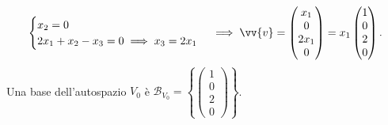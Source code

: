 \begin{dimostrazione}
\begin{enumerate}
\begin{equation}
\begin{cases}
            x_2 = 0 \\
            2x_1 + x_2 - x_3 = 0 \implies x_3 = 2x_1
        \end{cases}
        \implies \vv{v} = \begin{pmatrix} x_1 \\ 0 \\ 2x_1 \\ 0 \end{pmatrix} = x_1 \begin{pmatrix} 1 \\ 0 \\ 2 \\ 0 \end{pmatrix}.
    \end{equation}
    Una base dell'autospazio $V_0$ è $\mathcal{B}_{V_0} = \left\{ \begin{pmatrix} 1 \\ 0 \\ 2 \\ 0 \end{pmatrix} \right\}$.


\end{enumerate}
\end{dimostrazione}
